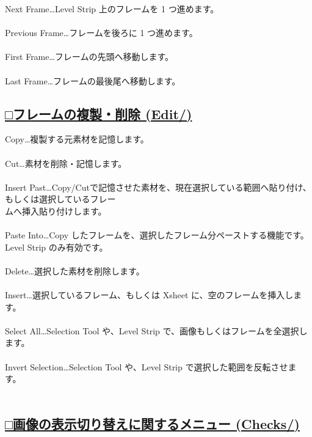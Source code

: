 \documentclass[a4paper,10pt]{article}
\begin{document}
\noindent Next Frame…Level Strip 上のフレームを 1 つ進めます。\\[-0.1em]
\\
Previous Frame…フレームを後ろに 1 つ進めます。\\[-0.1em]
\\
First Frame…フレームの先頭へ移動します。\\[-0.1em]
\\
Last Frame…フレームの最後尾へ移動します。\\[-0.1em]

\subsection*{\uline{□フレームの複製・削除 (Edit/)}}

\noindent Copy…複製する元素材を記憶します。\\[-0.1em]
\\
Cut…素材を削除・記憶します。\\[-0.1em]
\\
Insert Past…Copy/Cutで記憶させた素材を、現在選択している範囲へ貼り付け、もしくは選択しているフレー\\[-0.1em]
ムへ挿入貼り付けします。\\
\\
Paste Into…Copy したフレームを、選択したフレーム分ペーストする機能です。Level Strip のみ有効です。\\[-0.1em]
\\
Delete…選択した素材を削除します。\\[-0.1em]
\\
Insert…選択しているフレーム、もしくは Xsheet に、空のフレームを挿入します。\\[-0.1em]
\\
Select All…Selection Tool や、Level Strip で、画像もしくはフレームを全選択します。\\[-0.1em]
\\
Invert Selection…Selection Tool や、Level Strip で選択した範囲を反転させます。\\[-0.1em]
\\

\subsection*{\uline{□画像の表示切り替えに関するメニュー (Checks/)}}
\end{document}
